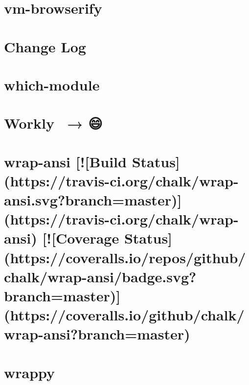 \documentclass[twoside]{book}
\newcommand{\+}{\discretionary{\mbox{\scriptsize$\hookleftarrow$}}{}{}}
\begin{document}
\chapter{vm-\/browserify}
\label{md_dsmacc_examples_DRmerge_node_modules_vm-browserify_readme}

\chapter{Change Log}
\label{md_dsmacc_examples_DRmerge_node_modules_which-module_CHANGELOG}

\chapter{which-\/module}
\label{md_dsmacc_examples_DRmerge_node_modules_which-module_README}

\chapter{Workly 🏋️‍♀️→ 😄}
\label{md_dsmacc_examples_DRmerge_node_modules_workly_README}

\chapter{wrap-\/ansi \mbox{[}!\mbox{[}Build Status\mbox{]}(https\+://travis-\/ci.org/chalk/wrap-\/ansi.svg?branch=master)\mbox{]}(https\+://travis-\/ci.org/chalk/wrap-\/ansi) \mbox{[}!\mbox{[}Coverage Status\mbox{]}(https\+://coveralls.io/repos/github/chalk/wrap-\/ansi/badge.svg?branch=master)\mbox{]}(https\+://coveralls.io/github/chalk/wrap-\/ansi?branch=master)}
\label{md_dsmacc_examples_DRmerge_node_modules_wrap-ansi_readme}

\chapter{wrappy}
\label{md_dsmacc_examples_DRmerge_node_modules_wrappy_README}

\end{document}
